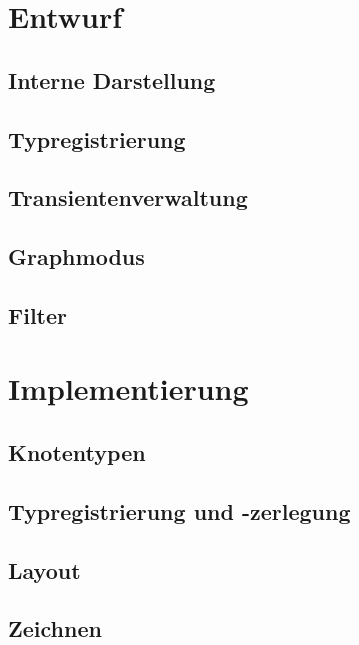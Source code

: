 \documentclass[12pt,a4paper]{article}
\begin{document}

\section{Entwurf}


\subsection{Interne Darstellung}

\subsection{Typregistrierung}

\subsection{Transientenverwaltung}

\subsection{Graphmodus}

\subsection{Filter} 



\section{Implementierung}

\subsection{Knotentypen}

\subsection{Typregistrierung und -zerlegung}

\subsection{Layout}

\subsection{Zeichnen}
\end{document}
